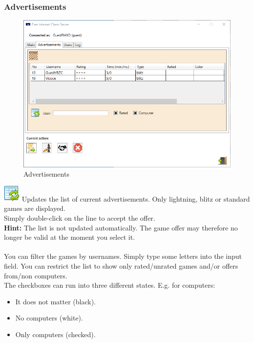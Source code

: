 \documentclass[11pt,a4paper]{article}
\begin{document}
\subsubsection{Advertisements}
\begin{figure}[H]
	\centering
	\includegraphics[scale=0.6]{fics6.png}
	\caption{Advertisements}
	\label{fig:ficsAds}
\end{figure}

\includegraphics[scale=0.5]{table_refresh.png} Updates the list of current advertisements. Only lightning, blitz or standard games are displayed.\\
Simply double-click on the line to accept the offer.\\
\textbf{Hint:} The list is not updated automatically. The game offer may therefore no longer be valid at the moment you select it.\\\\
You can filter the games by usernames. Simply type some letters into the input field.
You can restrict the list to show only rated/unrated games and/or offers from/non computers.\\
The checkboxes can run into three different states. E.g. for computers:
\begin{itemize}
	\item It does not matter (black).
	\item No computers (white).
	\item Only computers (checked).
\end{itemize}
\end{document}
